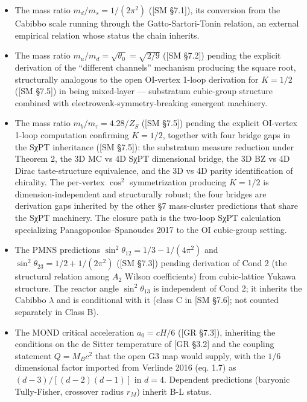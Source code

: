 \documentclass[
]{article}
\providecommand{\tightlist}{%
  \setlength{\itemsep}{0pt}\setlength{\parskip}{0pt}}
\begin{document}
\begin{itemize}
\tightlist
\item
  The mass ratio \(m_d/m_s = 1/(2\pi^2)\) ({[}SM §7.1{]}), its
  conversion from the Cabibbo scale running through the
  Gatto-Sartori-Tonin relation, an external empirical relation whose
  status the chain inherits.
\item
  The mass ratio \(m_u/m_d = \sqrt{\theta_0} = \sqrt{2/9}\) ({[}SM
  §7.2{]}) pending the explicit derivation of the ``different channels''
  mechanism producing the square root, structurally analogous to the
  open OI-vertex 1-loop derivation for \(K = 1/2\) ({[}SM §7.5{]}) in
  being mixed-layer --- substratum cubic-group structure combined with
  electroweak-symmetry-breaking emergent machinery.
\item
  The mass ratio \(m_b/m_\tau = 4.28/Z_S\) ({[}SM §7.5{]}) pending the
  explicit OI-vertex 1-loop computation confirming \(K = 1/2\), together
  with four bridge gaps in the SχPT inheritance ({[}SM §7.5{]}): the
  substratum measure reduction under Theorem 2, the 3D MC vs 4D SχPT
  dimensional bridge, the 3D BZ vs 4D Dirac taste-structure equivalence,
  and the 3D vs 4D parity identification of chirality. The per-vertex
  \(\cos^2\) symmetrization producing \(K = 1/2\) is
  dimension-independent and structurally robust; the four bridges are
  derivation gaps inherited by the other §7 mass-cluster predictions
  that share the SχPT machinery. The closure path is the two-loop SχPT
  calculation specializing Panagopoulos--Spanoudes 2017 to the OI
  cubic-group setting.
\item
  The PMNS predictions \(\sin^2\theta_{12} = 1/3 - 1/(4\pi^2)\) and
  \(\sin^2\theta_{23} = 1/2 + 1/(2\pi^2)\) ({[}SM §7.3{]}) pending
  derivation of Cond 2 (the structural relation among \(A_2\) Wilson
  coefficients) from cubic-lattice Yukawa structure. The reactor angle
  \(\sin^2\theta_{13}\) is independent of Cond 2; it inherits the
  Cabibbo \(\lambda\) and is conditional with it (class C in {[}SM
  §7.6{]}; not counted separately in Class B).
\item
  The MOND critical acceleration \(a_0 = cH/6\) ({[}GR §7.3{]}),
  inheriting the conditions on the de Sitter temperature of {[}GR
  §3.2{]} and the coupling statement \(Q = M_B c^2\) that the open G3
  map would supply, with the \(1/6\) dimensional factor imported from
  Verlinde 2016 (eq. 1.7) as \((d-3)/[(d-2)(d-1)]\) in \(d = 4\).
  Dependent predictions (baryonic Tully-Fisher, crossover radius
  \(r_M\)) inherit B-L status.
\end{itemize}
\end{document}
